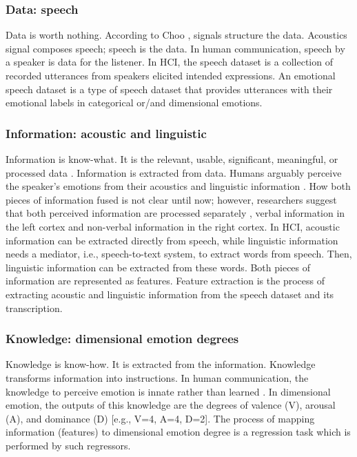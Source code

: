 \subsubsection{Data: speech}
Data is worth nothing. According to Choo \cite{Choo2007}, signals structure the
data. Acoustics signal composes speech; speech is the data. In human
communication, speech by a speaker is data for the listener. In HCI, the speech
dataset is a collection of recorded utterances from speakers elicited intended
expressions. An emotional speech dataset is a type of speech dataset that
provides utterances with their emotional labels in categorical or/and
dimensional emotions.

\subsubsection{Information: acoustic and linguistic}
Information is know-what. It is the relevant, usable, significant, meaningful,
or processed data \cite{Rowley2007}. Information is extracted from data. Humans
arguably perceive the speaker's emotions from their acoustics and linguistic
information \cite{Nygaard2008}. How both pieces of information fused is not
clear until now; however, researchers suggest that both perceived information
are processed separately \cite{Berckmoes2004, Kotz2011}, verbal information in
the left cortex and non-verbal information in the right cortex. In HCI,
acoustic information can be extracted directly from speech, while linguistic
information needs a mediator, i.e., speech-to-text system, to extract words
from speech. Then, linguistic information can be extracted from these words.
Both pieces of information are represented as features. Feature extraction is
the process of extracting acoustic and linguistic information from the speech
dataset and its transcription.

\subsubsection{Knowledge: dimensional emotion degrees}
Knowledge is know-how. It is extracted from the information. Knowledge
transforms information into instructions. In human communication, the knowledge
to perceive emotion is innate rather than learned \cite{Matsumoto2009}. In
dimensional emotion, the outputs of this knowledge are the degrees of valence
(V), arousal (A), and dominance (D) [e.g., V=4, A=4, D=2]. The process of
mapping information (features) to dimensional emotion degree is a regression
task which is performed by such regressors. 

